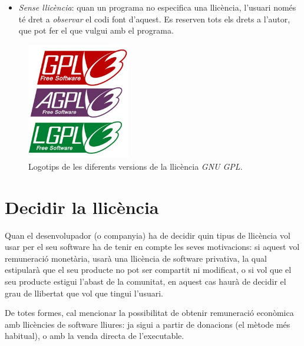 \begin{itemize}
	\item \emph{Sense llicència}: quan un programa no especifica una llicència, l'usuari només té dret a \emph{observar} el codi font d'aquest. Es reserven tots els drets a l'autor, que pot fer el que vulgui amb el programa.
\end{itemize}

\begin{figure}[ht!]
\centering
\includegraphics[width=45mm]{data/gpls.jpg}
\caption{Logotips de les diferents versions de la llicència \emph{GNU GPL}.}
\label{gpls}
\end{figure}

\section{Decidir la llicència}
Quan el desenvolupador (o companyia) ha de decidir quin tipus de llicència vol
usar per el seu software ha de tenir en compte les seves motivacions: si aquest
vol remuneració monetària, usarà una llicència de software privativa, la qual estipularà que el seu producte no pot ser compartit ni modificat, o si vol que el seu producte estigui l'abast de 
la comunitat, en aquest cas haurà de decidir el grau de llibertat que vol que tingui 
l'usuari.

De totes formes, cal mencionar la possibilitat de obtenir remuneració econòmica amb llicències
de software lliures: ja sigui a partir de donacions (el mètode més habitual), o amb la
venda directa de l'executable.
